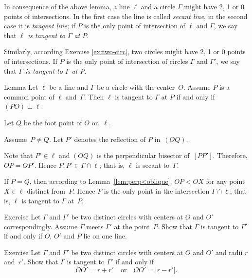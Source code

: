 In consequence of the above lemma, 
a line $\ell$ and a circle $\Gamma$ might have 2, 1 or 0 points of intersections.
In the first case the line is called \emph{secant line}, in the second case it is \emph{tangent line};
if $P$ is the only point of intersection of $\ell$ and $\Gamma$,
we say that {}\emph{$\ell$ is tangent to $\Gamma$ at $P$}. 

Similarly, according Exercise \ref{ex:two-circ},
two circles might have 2, 1 or 0 points of intersections.
If $P$ is the only point of intersection of circles $\Gamma$ and $\Gamma'$,
we say that \emph{$\Gamma$ is tangent to $\Gamma$ at $P$}. 

\begin{thm}[\abs]{Lemma}\label{lem:tangent}
Let $\ell$ be a line and $\Gamma$ be a circle with the center~$O$.
Assume $P$ is a common point of $\ell$ and~$\Gamma$. 
Then $\ell$ is tangent to $\Gamma$ at $P$ if and only if $(PO)\perp \ell$.
\end{thm}

Let $Q$ be the foot point of $O$ on~$\ell$.

Assume~$P\ne Q$.
Let $P'$ denotes the reflection of $P$ in~$(OQ)$.

Note that $P'\in\ell$ and $(OQ)$ is the perpendicular bisector of~$[PP']$.
Therefore, $OP=OP'$.
Hence $P,P'\in \Gamma\cap \ell$;
that is, $\ell$ is secant to~$\Gamma$.

If $P=Q$, 
then according to Lemma~\ref{lem:perp<oblique},
$OP<OX$ for any point $X\in \ell$ distinct from~$P$.
Hence $P$ is the only point in the intersection $\Gamma\cap\ell$;
that is, $\ell$ is tangent to $\Gamma$ at~$P$. 
\qeds

\begin{thm}{Exercise}\label{ex:tangent-circles}
Let $\Gamma$ and $\Gamma'$ be two distinct circles with centers at $O$ and $O'$ correspondingly. 
Assume $\Gamma$ meets $\Gamma'$ at the point~$P$.
Show that $\Gamma$ is tangent to $\Gamma'$ if and only if $O$, $O'$ and $P$ lie on one line.
\end{thm}

\begin{thm}{Exercise}\label{ex:tangent-circles-2}
Let $\Gamma$ and $\Gamma'$ be two distinct circles with centers at $O$ and $O'$ and radii $r$ and~$r'$.
Show that $\Gamma$ is tangent to $\Gamma'$ if and only if
$$OO'=r+r'
\quad
\text{or}\quad
OO'=|r-r'|.$$

\end{thm}

